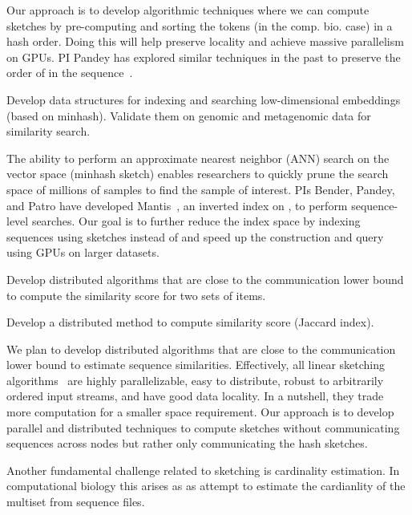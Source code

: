 Our approach is to develop algorithmic techniques where we can compute sketches by pre-computing and sorting the tokens (\kmers in the comp. bio. case) in a hash order. Doing this will help preserve locality and achieve massive parallelism on GPUs. PI Pandey has explored similar techniques in the past to preserve the order of \kmers in the sequence~\cite{Marais2019}.

\begin{rproblem}
Develop data structures for indexing and searching low-dimensional embeddings (based on minhash). Validate them on genomic and metagenomic data for similarity search.
\end{rproblem}


The ability to perform an approximate nearest neighbor (ANN) search on the vector space (minhash sketch) enables researchers to quickly prune the search space of millions of samples to find the sample of interest. PIs  Bender, Pandey, and Patro have developed Mantis~\cite{PandeyAlBe18}, an inverted index on \kmers, to perform sequence-level searches. Our goal is to further reduce the index space by indexing sequences using sketches instead of \kmers and speed up the construction and query using GPUs on larger datasets.

\begin{rproblem}
Develop distributed algorithms that are close to the communication lower bound to compute the similarity score for two sets of items. 
\end{rproblem}

\begin{rproblem}
Develop a distributed method to compute similarity score (Jaccard index).
\end{rproblem}

We plan to develop distributed algorithms that are close to the communication lower bound to estimate sequence similarities. Effectively, all linear sketching algorithms~\cite{li2014sketchuniversal} are highly parallelizable, easy to distribute, robust to arbitrarily ordered input streams, and have good data locality. In a nutshell, they trade more computation for a smaller space requirement. Our approach is to develop parallel and distributed techniques to compute sketches without communicating sequences across nodes but rather only communicating the hash sketches.

Another fundamental challenge related to sketching is cardinality estimation. In computational biology this arises as as attempt to estimate the cardianlity of the \kmer multiset from sequence files. 

